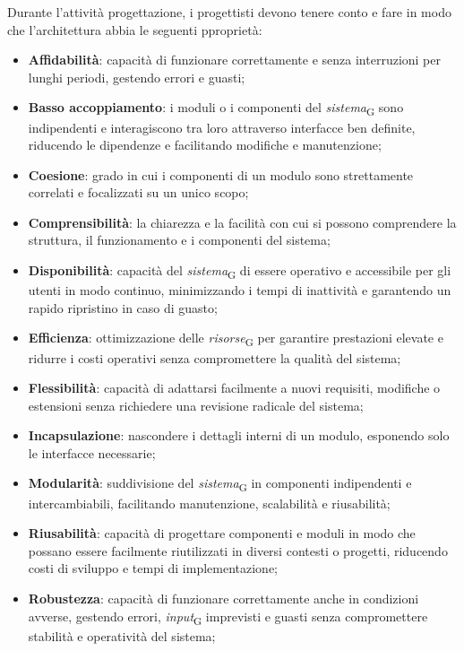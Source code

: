Durante l'attività progettazione, i progettisti devono tenere conto e fare in modo che l'architettura abbia le seguenti pproprietà:
\begin{itemize}
    \item \textbf{Affidabilità}: capacità di funzionare correttamente e senza interruzioni per lunghi periodi, gestendo errori e guasti;
    \item \textbf{Basso accoppiamento}: i moduli o i componenti del \textit{sistema}\textsubscript{G} sono indipendenti e interagiscono tra loro attraverso interfacce ben definite, riducendo le dipendenze e facilitando modifiche e manutenzione;
    \item \textbf{Coesione}: grado in cui i componenti di un modulo sono strettamente correlati e focalizzati su un unico scopo;
    \item \textbf{Comprensibilità}: la chiarezza e la facilità con cui si possono comprendere la struttura, il funzionamento e i componenti del sistema;
    \item \textbf{Disponibilità}: capacità del \textit{sistema}\textsubscript{G} di essere operativo e accessibile per gli utenti in modo continuo, minimizzando i tempi di inattività e garantendo un rapido ripristino in caso di guasto;
    \item \textbf{Efficienza}: ottimizzazione delle \textit{risorse}\textsubscript{G} per garantire prestazioni elevate e ridurre i costi operativi senza compromettere la qualità del sistema;
    \item \textbf{Flessibilità}: capacità di adattarsi facilmente a nuovi requisiti, modifiche o estensioni senza richiedere una revisione radicale del sistema;
    \item \textbf{Incapsulazione}: nascondere i dettagli interni di un modulo, esponendo solo le interfacce necessarie;
    \item \textbf{Modularità}: suddivisione del \textit{sistema}\textsubscript{G} in componenti indipendenti e intercambiabili, facilitando manutenzione, scalabilità e riusabilità;
    \item \textbf{Riusabilità}: capacità di progettare componenti e moduli in modo che possano essere facilmente riutilizzati in diversi contesti o progetti, riducendo costi di sviluppo e tempi di implementazione;
    \item \textbf{Robustezza}: capacità di funzionare correttamente anche in condizioni avverse, gestendo errori, \textit{input}\textsubscript{G} imprevisti e guasti senza compromettere stabilità e operatività del sistema;

\end{itemize}
